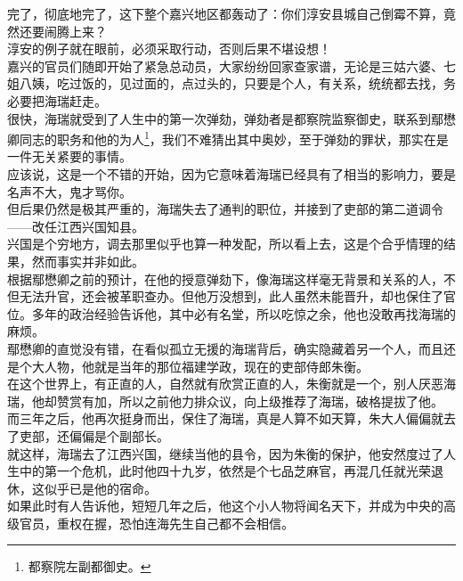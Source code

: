 \begin{multicols}{\theparacolNo}
完了，彻底地完了，这下整个嘉兴地区都轰动了：你们淳安县城自己倒霉不算，竟然还要闹腾上来？\\

淳安的例子就在眼前，必须采取行动，否则后果不堪设想！\\

嘉兴的官员们随即开始了紧急总动员，大家纷纷回家查家谱，无论是三姑六婆、七姐八姨，吃过饭的，见过面的，点过头的，只要是个人，有关系，统统都去找，务必要把海瑞赶走。\\

很快，海瑞就受到了人生中的第一次弹劾，弹劾者是都察院监察御史，联系到鄢懋卿同志的职务和他的为人\footnote{都察院左副都御史。}，我们不难猜出其中奥妙，至于弹劾的罪状，那实在是一件无关紧要的事情。\\

应该说，这是一个不错的开始，因为它意味着海瑞已经具有了相当的影响力，要是名声不大，鬼才骂你。\\

但后果仍然是极其严重的，海瑞失去了通判的职位，并接到了吏部的第二道调令——改任江西兴国知县。\\

兴国是个穷地方，调去那里似乎也算一种发配，所以看上去，这是个合乎情理的结果，然而事实并非如此。\\

根据鄢懋卿之前的预计，在他的授意弹劾下，像海瑞这样毫无背景和关系的人，不但无法升官，还会被革职查办。但他万没想到，此人虽然未能晋升，却也保住了官位。多年的政治经验告诉他，其中必有名堂，所以吃惊之余，他也没敢再找海瑞的麻烦。\\

鄢懋卿的直觉没有错，在看似孤立无援的海瑞背后，确实隐藏着另一个人，而且还是个大人物，他就是当年的那位福建学政，现在的吏部侍郎朱衡。\\

在这个世界上，有正直的人，自然就有欣赏正直的人，朱衡就是一个，别人厌恶海瑞，他却赞赏有加，所以之前他力排众议，向上级推荐了海瑞，破格提拔了他。\\

而三年之后，他再次挺身而出，保住了海瑞，真是人算不如天算，朱大人偏偏就去了吏部，还偏偏是个副部长。\\

就这样，海瑞去了江西兴国，继续当他的县令，因为朱衡的保护，他安然度过了人生中的第一个危机，此时他四十九岁，依然是个七品芝麻官，再混几任就光荣退休，这似乎已是他的宿命。\\

如果此时有人告诉他，短短几年之后，他这个小人物将闻名天下，并成为中央的高级官员，重权在握，恐怕连海先生自己都不会相信。\\


\end{multicols}
